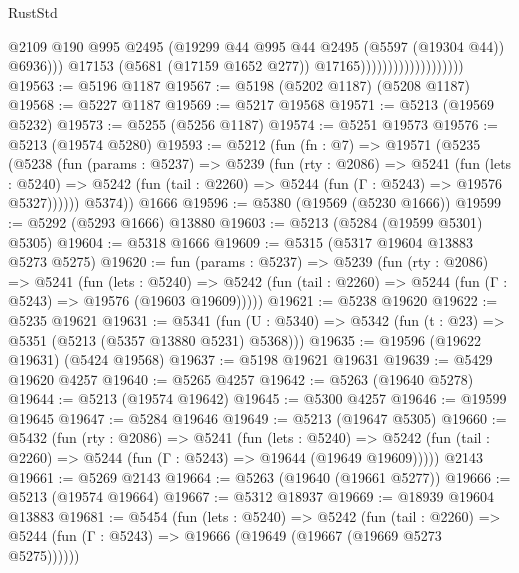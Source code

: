 \begin{lexlean}{RustStd}
\begin{coremodule}
                                              @2109
                                              @190
                                              @995
                                              @2495
                                              (@19299
                                                @44
                                                @995
                                                @44
                                                @2495
                                                (@5597 (@19304 @44))
                                                @6936)))
                                          @17153
                                          (@5681 (@17159 @1652 @277))
                                          @17165)))))))))))))))))))
@19563 := @5196 @1187
@19567 := @5198 (@5202 @1187) (@5208 @1187)
@19568 := @5227 @1187
@19569 := @5217 @19568
@19571 := @5213 (@19569 @5232)
@19573 := @5255 (@5256 @1187)
@19574 := @5251 @19573
@19576 := @5213 (@19574 @5280)
@19593 := @5212
    (fun (fn : @7) =>
    @19571
      (@5235
        (@5238
          (fun (params : @5237) =>
          @5239
            (fun (rty : @2086) =>
            @5241
              (fun (lets : @5240) =>
              @5242 (fun (tail : @2260) => @5244 (fun (Γ : @5243) => @19576 @5327))))))
        @5374))
    @1666
@19596 := @5380 (@19569 (@5230 @1666))
@19599 := @5292 (@5293 @1666) @13880
@19603 := @5213 (@5284 (@19599 @5301) @5305)
@19604 := @5318 @1666
@19609 := @5315 (@5317 @19604 @13883 @5273 @5275)
@19620 := fun (params : @5237) =>
  @5239
    (fun (rty : @2086) =>
    @5241
      (fun (lets : @5240) =>
      @5242 (fun (tail : @2260) => @5244 (fun (Γ : @5243) => @19576 (@19603 @19609)))))
@19621 := @5238 @19620
@19622 := @5235 @19621
@19631 := @5341
    (fun (U : @5340) => @5342 (fun (t : @23) => @5351 (@5213 (@5357 @13880 @5231) @5368)))
@19635 := @19596 (@19622 @19631) (@5424 @19568)
@19637 := @5198 @19621 @19631
@19639 := @5429 @19620 @4257
@19640 := @5265 @4257
@19642 := @5263 (@19640 @5278)
@19644 := @5213 (@19574 @19642)
@19645 := @5300 @4257
@19646 := @19599 @19645
@19647 := @5284 @19646
@19649 := @5213 (@19647 @5305)
@19660 := @5432
    (fun (rty : @2086) =>
    @5241
      (fun (lets : @5240) =>
      @5242 (fun (tail : @2260) => @5244 (fun (Γ : @5243) => @19644 (@19649 @19609)))))
    @2143
@19661 := @5269 @2143
@19664 := @5263 (@19640 (@19661 @5277))
@19666 := @5213 (@19574 @19664)
@19667 := @5312 @18937
@19669 := @18939 @19604 @13883
@19681 := @5454
    (fun (lets : @5240) =>
    @5242
      (fun (tail : @2260) =>
      @5244 (fun (Γ : @5243) => @19666 (@19649 (@19667 (@19669 @5273 @5275))))))

\end{coremodule}
\end{lexlean}
